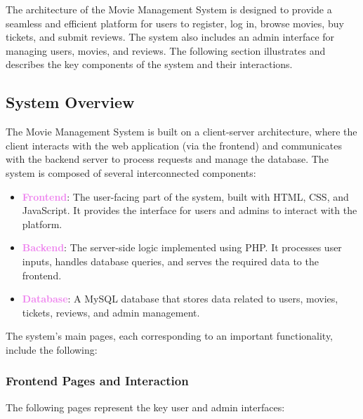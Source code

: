 \documentclass[a4paper,12pt]{article}  %
\renewcommand{\textbf}[1]{\textcolor{violet}{\bfseries #1}}
\begin{document}
The architecture of the Movie Management System is designed to provide a seamless and efficient platform for users to register, log in, browse movies, buy tickets, and submit reviews. The system also includes an admin interface for managing users, movies, and reviews. The following section illustrates and describes the key components of the system and their interactions.

\subsection{System Overview}
The Movie Management System is built on a client-server architecture, where the client interacts with the web application (via the frontend) and communicates with the backend server to process requests and manage the database. The system is composed of several interconnected components:

\begin{itemize}
    \item \textbf{Frontend}: The user-facing part of the system, built with HTML, CSS, and JavaScript. It provides the interface for users and admins to interact with the platform.
    \item \textbf{Backend}: The server-side logic implemented using PHP. It processes user inputs, handles database queries, and serves the required data to the frontend.
    \item \textbf{Database}: A MySQL database that stores data related to users, movies, tickets, reviews, and admin management.
\end{itemize}

The system’s main pages, each corresponding to an important functionality, include the following:

\subsubsection{Frontend Pages and Interaction}
The following pages represent the key user and admin interfaces:
\end{document}
